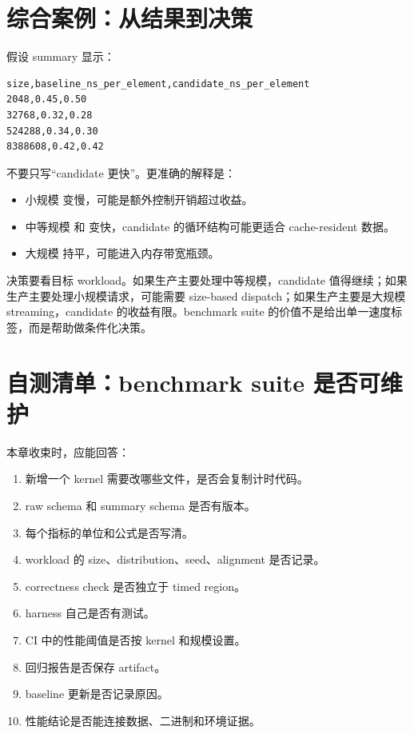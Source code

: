 \section{综合案例：从结果到决策}

假设 summary 显示：

\begin{lstlisting}
size,baseline_ns_per_element,candidate_ns_per_element
2048,0.45,0.50
32768,0.32,0.28
524288,0.34,0.30
8388608,0.42,0.42
\end{lstlisting}

不要只写“candidate 更快”。更准确的解释是：

\begin{itemize}
  \item 小规模  变慢，可能是额外控制开销超过收益。
  \item 中等规模  和  变快，candidate 的循环结构可能更适合 cache-resident 数据。
  \item 大规模  持平，可能进入内存带宽瓶颈。
\end{itemize}

决策要看目标 workload。如果生产主要处理中等规模，candidate 值得继续；如果生产主要处理小规模请求，可能需要 size-based dispatch；如果生产主要是大规模 streaming，candidate 的收益有限。benchmark suite 的价值不是给出单一速度标签，而是帮助做条件化决策。

\section{自测清单：benchmark suite 是否可维护}

本章收束时，应能回答：

\begin{enumerate}
  \item 新增一个 kernel 需要改哪些文件，是否会复制计时代码。
  \item raw schema 和 summary schema 是否有版本。
  \item 每个指标的单位和公式是否写清。
  \item workload 的 size、distribution、seed、alignment 是否记录。
  \item correctness check 是否独立于 timed region。
  \item harness 自己是否有测试。
  \item CI 中的性能阈值是否按 kernel 和规模设置。
  \item 回归报告是否保存 artifact。
  \item baseline 更新是否记录原因。
  \item 性能结论是否能连接数据、二进制和环境证据。
\end{enumerate}

